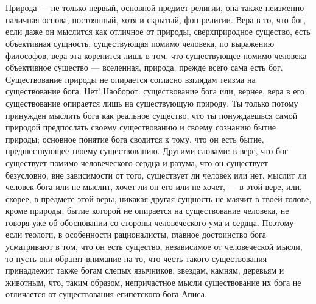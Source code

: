 \documentclass[12pt,oneside]{book}
\begin{document}
\chapter{}

Природа --- не только первый, основной предмет религии, она также неизменно наличная основа, постоянный, хотя и скрытый, фон религии. Вера в то, что бог, если даже он мыслится как отличное от природы, сверхприродное существо, есть объективная сущность, существующая помимо человека, по выражению философов, вера эта коренится лишь в том, что существующее помимо человека объективное существо --- вселенная, природа, прежде всего сама есть бог. Существование природы не опирается согласно взглядам теизма на существование бога. Нет! Наоборот: существование бога или, вернее, вера в его существование опирается лишь на существующую природу. Ты только потому принужден мыслить бога как реальное существо, что ты понуждаешься самой природой предпослать своему существованию и своему сознанию бытие природы; основное понятие бога сводится к тому, что он есть бытие, предшествующее твоему существованию. Другими словами: в вере, что бог существует помимо человеческого сердца и разума, что он существует безусловно, вне зависимости от того, существует ли человек или нет, мыслит ли человек бога или не мыслит, хочет ли он его или не хочет, --- в этой вере, или, скорее, в предмете этой веры, никакая другая сущность не маячит в твоей голове, кроме природы, бытие которой не опирается на существование человека, не говоря уже об обосновании со стороны человеческого ума и сердца. Поэтому если теологи, в особенности рационалисты, главное достоинство бога усматривают в том, что он есть существо, независимое от человеческой мысли, то пусть они обратят внимание на то, что честь такого существования принадлежит также богам слепых язычников, звездам, камням, деревьям и животным, что, таким образом, непричастное мысли существование их бога не отличается от существования египетского бога Аписа.



\chapter{}
\end{document}
